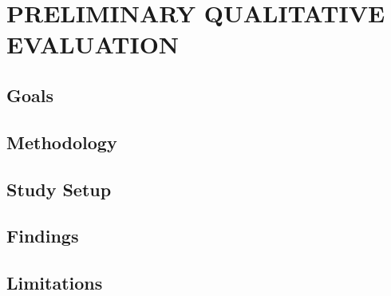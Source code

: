 \fancyhead[RO,LE]{\thepage}
\fancyfoot{} 
\chapter{PRELIMINARY QUALITATIVE EVALUATION}
\section{Goals}
\section{Methodology}
\section{Study Setup}
\section{Findings}
\section{Limitations}
